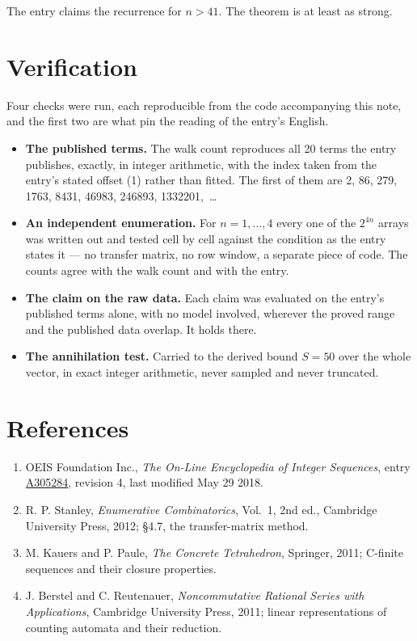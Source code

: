 \documentclass[11pt]{article}
\theoremstyle{definition}
\begin{document}
The entry claims the recurrence for $n > 41$. The theorem is at least as strong.

\section{Verification}

Four checks were run, each reproducible from the code accompanying this note, and the first two are what pin the reading of the entry's English.

\begin{itemize}

\item {\bfseries The published terms.} The walk count reproduces all 20 terms the entry publishes, exactly, in integer arithmetic, with the index taken from the entry's stated offset (1) rather than fitted. The first of them are 2, 86, 279, 1763, 8431, 46983, 246893, 1332201,~\dots

\item {\bfseries An independent enumeration.} For $n = 1,\dots,4$ every one of the $2^{4n}$ arrays was written out and tested cell by cell against the condition as the entry states it --- no transfer matrix, no row window, a separate piece of code. The counts agree with the walk count and with the entry.

\item {\bfseries The claim on the raw data.} Each claim was evaluated on the entry's published terms alone, with no model involved, wherever the proved range and the published data overlap. It holds there.

\item {\bfseries The annihilation test.} Carried to the derived bound $S = 50$ over the whole vector, in exact integer arithmetic, never sampled and never truncated.

\end{itemize}

\section{References}

\begin{enumerate}

\item OEIS Foundation Inc., \emph{The On-Line Encyclopedia of Integer Sequences}, entry \href{https://oeis.org/A305284}{A305284}, revision 4, last modified May 29 2018.

\item R. P. Stanley, \emph{Enumerative Combinatorics}, Vol.~1, 2nd ed., Cambridge University Press, 2012; \S4.7, the transfer-matrix method.

\item M. Kauers and P. Paule, \emph{The Concrete Tetrahedron}, Springer, 2011; C-finite sequences and their closure properties.

\item J. Berstel and C. Reutenauer, \emph{Noncommutative Rational Series with Applications}, Cambridge University Press, 2011; linear representations of counting automata and their reduction.

\end{enumerate}
\end{document}
